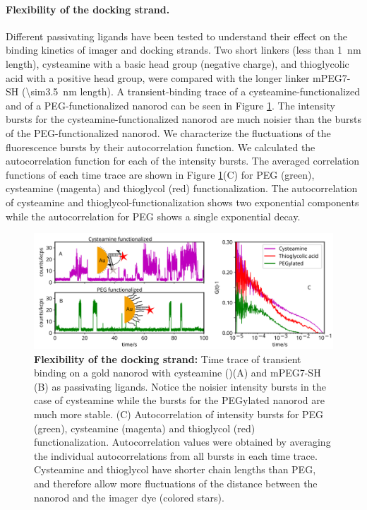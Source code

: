 \paragraph*{Flexibility of the docking strand.} Different passivating ligands have been tested to understand their effect on the binding kinetics of imager and docking strands.
Two short linkers (less than \SI{1}{\nm} length), cysteamine with a basic head group (negative charge), and thioglycolic acid with a positive head group, were compared with the longer linker mPEG7-SH (\SI{\sim3.5}{\nm} length).
A transient-binding trace of a cysteamine-functionalized and of a PEG-functionalized nanorod can be seen in Figure \ref{fig:timetraceCysvsPeg}.
The intensity bursts for the cysteamine-functionalized nanorod are much noisier than the bursts of the PEG-functionalized nanorod.
We characterize the fluctuations of the fluorescence bursts by their autocorrelation function. We calculated the autocorrelation function for each of the intensity bursts. The averaged correlation functions of each time trace are shown in Figure \ref{fig:timetraceCysvsPeg}(C) for  PEG (green), cysteamine (magenta) and thioglycol (red) functionalization.
The autocorrelation of cysteamine and thioglycol-functionalization shows two exponential components while the autocorrelation for PEG shows a single exponential decay.
\begin{figure}[ht]
	\centering
	\includegraphics[width=\textwidth]{timetraceCysvsPeg}
	\caption{\textbf{Flexibility of the docking strand:} Time trace of transient binding on a gold nanorod with cysteamine ()(A) and mPEG7-SH (B) as passivating ligands.
	Notice the noisier intensity bursts in the case of cysteamine while the bursts for the PEGylated nanorod are much more stable.
	(C) Autocorrelation of intensity bursts for PEG (green), cysteamine (magenta) and thioglycol (red) functionalization.
	Autocorrelation values were obtained by averaging the individual autocorrelations from all bursts in each time trace. 
	Cysteamine and thioglycol have shorter chain lengths than PEG, and therefore allow more fluctuations of the distance between the nanorod and the imager dye (colored stars).}
  	\label{fig:timetraceCysvsPeg}
\end{figure}



